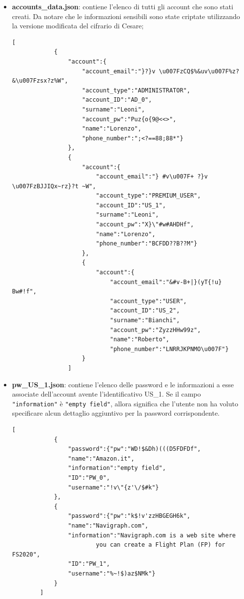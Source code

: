 \documentclass[a4paper, 12pt, one column, aas_macros]{article}
\begin{document}
\begin{itemize}
		\item \textbf{accounts\_data.json}: contiene l'elenco di tutti gli account che sono stati creati. Da notare che le informazioni sensibili sono state criptate utilizzando la versione modificata del cifrario di Cesare;
		\begin{Verbatim}[tabsize=1]
		[
			{
				"account":{
					"account_email":"}?}v \u007FzCQ$%&uv\u007F%z?&\u007Fzsx?z%W",
					"account_type":"ADMINISTRATOR",
					"account_ID":"AD_0",
					"surname":"Leoni",
					"account_pw":"Puz{o{9@<<>",
					"name":"Lorenzo",
					"phone_number":";<?==88;88*"}
				},
				{
					"account":{
						"account_email":"} #v\u007F+ ?}v \u007FzBJJIQx~rz}?t ~W",
						"account_type":"PREMIUM_USER",
						"account_ID":"US_1",
						"surname":"Leoni",
						"account_pw":"X}\"#w#AHDHf",
						"name":"Lorenzo",
						"phone_number":"BCFDD??B??M"}
					},
					{
						"account":{
							"account_email":"&#v-B+|}(yT{!u} Bw#!f",
							"account_type":"USER",
							"account_ID":"US_2",
							"surname":"Bianchi",
							"account_pw":"ZyzzHHw99z",
							"name":"Roberto",
							"phone_number":"LNRRJKPNMO\u007F"}
					}
				]
		\end{Verbatim}
	
		\item \textbf{pw\_US\_1.json}: contiene l'elenco delle password e le informazioni a esse associate dell'account avente l'identificativo US\_1. Se il campo \verb|"information"| è \verb|"empty field"|, allora significa che l'utente non ha voluto specificare alcun dettaglio aggiuntivo per la password corrispondente. 
		\begin{Verbatim}[tabsize=1]
		[
			{
				"password":{"pw":"WD!$&Dh)(((D5FDFDf",
				"name":"Amazon.it",
				"information":"empty field",
				"ID":"PW_0",
				"username":"!v\"{z'\/$#k"}
			},
			{
				"password":{"pw":"k$!v'zzHBGEGH6k",
				"name":"Navigraph.com",
				"information":"Navigraph.com is a web site where 
						you can create a Flight Plan (FP) for FS2020",
				"ID":"PW_1",
				"username":"%~!$)az$NMk"}
			}
		]
		\end{Verbatim}
	\end{itemize}
\end{document}
